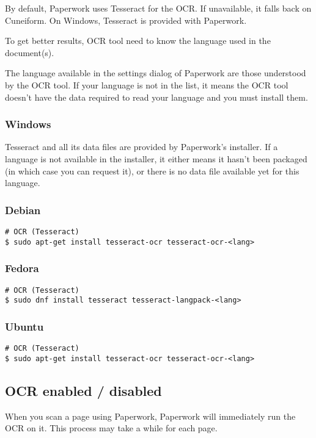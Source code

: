 \documentclass[10pt,a4paper]{article}
\begin{document}
By default, Paperwork uses Tesseract for the OCR. If unavailable,
it falls back on Cuneiform. On Windows, Tesseract is provided with
Paperwork.

To get better results, OCR tool need to know the language used in
the document(s).

The language available in the settings dialog of Paperwork are those
understood by the OCR tool. If your language is not in the list, it
means the OCR tool doesn't have the data required to read your language
and you must install them.

\subsubsection{Windows}

Tesseract and all its data files are provided by Paperwork's installer.
If a language is not available in the installer, it either means it
hasn't been packaged (in which case you can request it), or there
is no data file available yet for this language.

\subsubsection{Debian}
\begin{verbatim}
# OCR (Tesseract)
$ sudo apt-get install tesseract-ocr tesseract-ocr-<lang>
\end{verbatim}

\subsubsection{Fedora}
\begin{verbatim}
# OCR (Tesseract)
$ sudo dnf install tesseract tesseract-langpack-<lang>
\end{verbatim}

\subsubsection{Ubuntu}
\begin{verbatim}
# OCR (Tesseract)
$ sudo apt-get install tesseract-ocr tesseract-ocr-<lang> 
\end{verbatim}

\subsection{OCR enabled / disabled}

When you scan a page using Paperwork, Paperwork will immediately run
the OCR on it. This process may take a while for each page.
\end{document}
